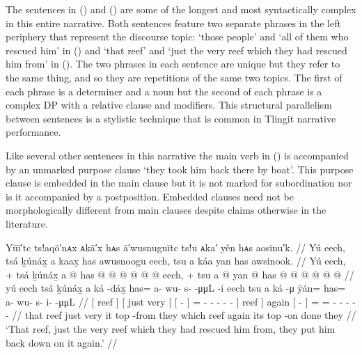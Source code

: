 The sentences in (\lastx) and (\nextx) are some of the longest and most syntactically complex in this entire narrative.
Both sentences feature two separate phrases in the left periphery that represent the discourse topic:  ‘those people’ and  ‘all of them who rescued him’ in (\lastx) and  ‘that reef’ and  ‘just the very reef which they had rescued him from’ in (\nextx).
The two phrases in each sentence are unique but they refer to the same thing, and so they are repetitions of the same two topics.
The first of each phrase is a determiner and a noun but the second of each phrase is a complex DP with a relative clause and modifiers.
This structural parallelism between sentences is a stylistic technique that is common in Tlingit narrative performance.

Like several other sentences in this narrative the main verb in (\lastx) is accompanied by an unmarked purpose clause  ‘they took him back there by boat’.
This purpose clause is embedded in the main clause but it is not marked for subordination nor is it accompanied by a postposition.
Embedded clauses need not be morphologically different from main clauses despite claims otherwise in the literature.

\ex\label{ex:106-39-put-him-back}%
%
\begingl
	\glpreamble	Yūī′tc ts!aqō′nᴀx ᴀkā′x hᴀs ā′wusnuguītc ts!u ᴀka′ yên hᴀs aosinu′k. //
	\glpreamble	Yú eech, tsá ḵúnáx̱ a kaax̱ has awusnoogu eech, tsu a káa yan has awsinook. //
	\gla	{} Yú eech, {} +
		{} tsá ḵúnáx̱ {} {} a  @ {} {}
		has @  @ {} @ {} @ {} @ {} @ {} {} eech, {} +
		tsu
		{} a  @ {} {}
		yan @ has @  @ {} @ {} @ {} @ {} @ {} //
	\glb	{} yú eech {}
		{} tsá ḵúnáx̱ {} {} a ká -dáx̱ {}
		has= a- wu- s-  -μμL -i {} eech {}
		tsu
		{} a ká -μ {}
		ÿán= has= a- wu- s- i-  -μμL //
	\glc	{}[  reef {}]
		{}[ just very {}[ {}[   - {}]
		= - - -  - - {}] reef {}]
		again
		{}[   - {}]
		= = - - - -  - //
	\gld	{} that reef {}
		{} just very {} {} it top -from {}
		they  {} {} {} {} \·which {} reef {}
		again
		{} its top -on {}
		done they  {} {} {} {} {} //
	\glft	‘That reef, just the very reef which they had rescued him from, they put him back down on it again.’
		//
\endgl
\xe

